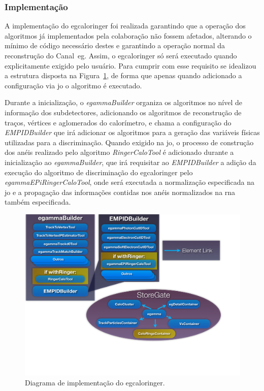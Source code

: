 \subsubsection{Implementação}
\label{sssec:egringer_impl}

A implementação do \gls{egcaloringer} foi realizada garantindo que a operação
dos algoritmos já implementados pela colaboração não fossem afetados, alterando
o mínimo de código necessário destes e garantindo a operação normal da
reconstrução do Canal~\gls{eg}. Assim, o \gls{egcaloringer} só será executado
quando explicitamente exigido pelo usuário. 
Para cumprir com esse requisito se idealizou a 
estrutura disposta na Figura~\ref{fig:implementacao_ringer}, de forma que apenas
quando adicionado a configuração via \glsdesc{jo} o algoritmo é executado.

Durante a inicialização, o \emph{egammaBuilder} organiza os algoritmos no
nível de informação dos subdetectores, adicionando os algoritmos de reconstrução
de traços, vértices e aglomerados do calorímetro, e chama a configuração do
\emph{EMPIDBuilder} que irá adicionar os algoritmos para a geração das variáveis
físicas utilizadas para a discriminação. Quando exigido na \glsdesc{jo}, o
processo de construção dos anéis realizado pelo algoritmo \emph{RingerCaloTool} 
é adicionado durante a inicialização ao \emph{egammaBuilder}, 
que irá requisitar ao \emph{EMPIDBuilder} a adição da
execução do algoritmo de discriminação do \gls{egcaloringer} pelo
\emph{egammaEPiRingerCaloTool}, onde será executada a normalização especificada 
na \glsdesc{jo} e a propagação das informações contidas nos anéis normalizados 
na \gls{rna} também especificada. 

\begin{figure}[ht!]
\label{fig:implementacao_ringer}
\centering
\includegraphics[width=1.0\textwidth]{imagens/implementacao_ringer.pdf}
\caption[Diagrama de implementação do \protect\gls{egcaloringer}]{Diagrama de
implementação do \gls{egcaloringer}.}
\end{figure}

